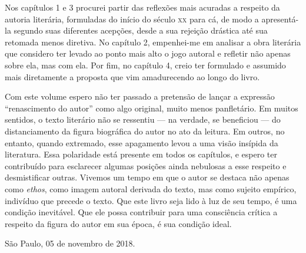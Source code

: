 Nos capítulos 1 e 3 procurei partir das reflexões mais acuradas a respeito da autoria literária, formuladas do início do século \textsc{xx} para cá, de modo a apresentá-la segundo suas diferentes acepções, desde a sua rejeição drástica até sua retomada menos diretiva. No capítulo 2, empenhei-me em analisar a obra literária que considero ter levado ao ponto mais alto o jogo autoral e refletir não apenas sobre ela, mas com ela. Por fim, no capítulo 4, creio ter formulado e assumido mais diretamente a proposta que vim amadurecendo ao longo do livro. 

Com este volume espero não ter passado a pretensão de lançar a expressão ``renascimento do autor'' como algo original, muito menos panfletário. Em muitos sentidos, o texto literário não se ressentiu --- na verdade, se beneficiou --- do distanciamento da figura biográfica do autor no ato da leitura. Em outros, no entanto, quando extremado, esse apagamento levou a uma visão insípida da literatura. Essa polaridade está presente em todos os capítulos, e espero ter contribuído para esclarecer algumas posições ainda nebulosas a esse respeito e desmistificar outras. Vivemos um tempo em que o autor se destaca não apenas como \emph{ethos}, como imagem autoral derivada do texto, mas como sujeito empírico, indivíduo que precede o texto. Que este livro seja lido à luz de seu tempo, é uma condição inevitável. Que ele possa contribuir para uma consciência crítica a respeito da figura do autor em sua época, é sua condição ideal. 

\bigskip
\bigskip

\begin{flushright}
São Paulo, 05 de novembro de 2018.
\end{flushright}